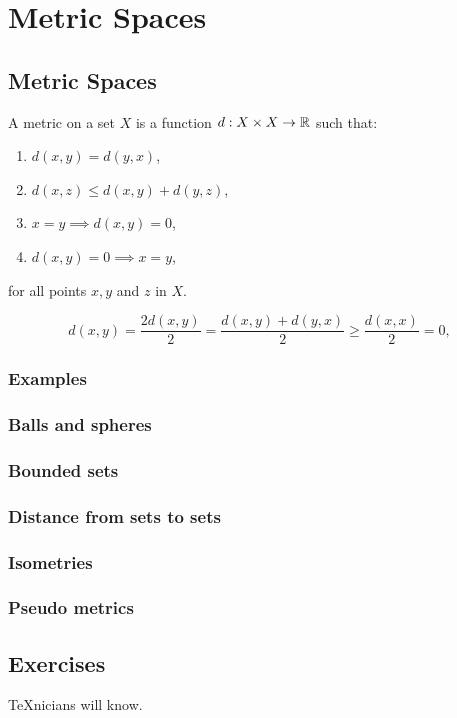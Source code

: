 \chapter{Metric Spaces}\label{chp:metric-spaces}

\section{Metric Spaces}\label{sec:metric-spaces}

\begin{definition}
  A metric on a set \(X\) is a function \(d:X\times{X}\to\mathbb{R}\) such that:
  \begin{enumerate}
    \item
      \(d(x,y)=d(y,x)\),
    \item
      \(d(x,z)\leqslant{d(x,y)+d(y,z)}\),
    \item
      \(x=y\implies{d(x,y)=0}\),
    \item
      \(d(x,y)=0\implies{x=y}\),
  \end{enumerate}
  for all points \(x,y\) and \(z\) in \(X\).
\end{definition}

\[
  d(x,y)
  =
  \frac{2d(x,y)}{2}
  =
  \frac{d(x,y)+d(y,x)}{2}
  \geqslant
  \frac{d(x,x)}{2}
  =
  0,
\]

\subsection{Examples}

\subsection{Balls and spheres}

\subsection{Bounded sets}

\subsection{Distance from sets to sets}

\subsection{Isometries}

\subsection{Pseudo metrics}

\section{Exercises}

\begin{exercise}
  \TeX{}nicians will know.
\end{exercise}
